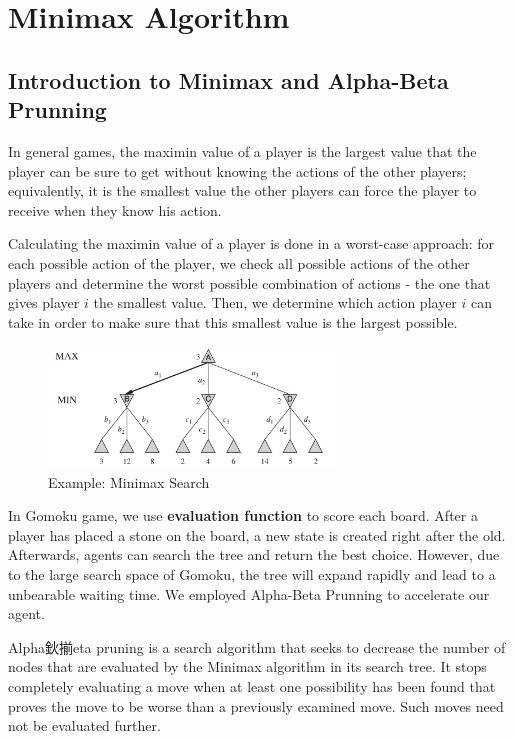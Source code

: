 \documentclass[12pt,a4paper]{article}
\begin{document}
\section{Minimax Algorithm}

\subsection{Introduction to Minimax and Alpha-Beta Prunning}

In general games, the maximin value of a player is the largest value that the player can be sure to get without knowing the actions of the other players; equivalently, it is the smallest value the other players can force the player to receive when they know his action.

Calculating the maximin value of a player is done in a worst-case approach: for each possible action of the player, we check all possible actions of the other players and determine the worst possible combination of actions - the one that gives player $i$ the smallest value. Then, we determine which action player $i$ can take in order to make sure that this smallest value is the largest possible.

\begin{figure}[!h]
\centering\includegraphics[width=3in]{3.png}
\caption{Example: Minimax Search}
\end{figure}

In Gomoku game, we use \textbf{evaluation function} to score each board. After a player has placed a stone on the board, a new state is created right after the old. Afterwards, agents can search the tree and return the best choice. However, due to the large search space of Gomoku, the tree will expand rapidly and lead to a unbearable waiting time. We employed Alpha-Beta Prunning to accelerate our agent.

Alpha鈥揃eta pruning is a search algorithm that seeks to decrease the number of nodes that are evaluated by the Minimax algorithm in its search tree. It stops completely evaluating a move when at least one possibility has been found that proves the move to be worse than a previously examined move. Such moves need not be evaluated further.
\end{document}
